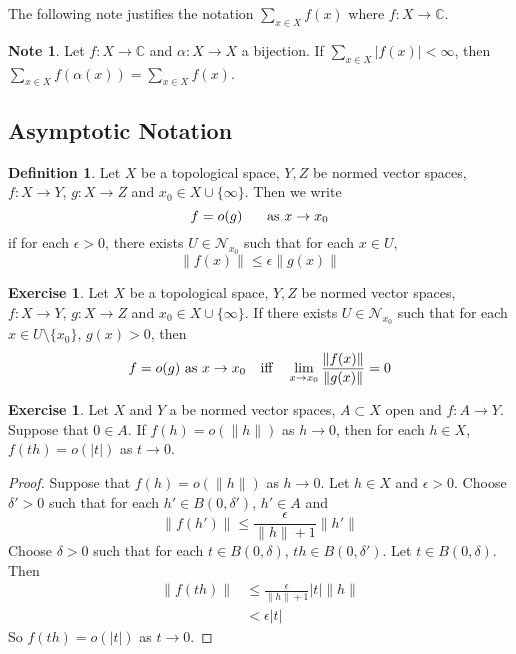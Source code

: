 \documentclass[12pt]{amsart}
\theoremstyle{definition}
\newtheorem{defn}[definition]{Definition}
\newtheorem{note}[definition]{Note}
\newtheorem{ex}[definition]{Exercise}
\newcommand{\al}{\alpha}
\newcommand{\del}{\delta}
\newcommand{\ep}{\epsilon}
\newcommand{\C}{\mathbb{C}}
\newcommand{\MN}{\mathcal{N}}
\newcommand{\lex}[1]{\label{ex:#1}}
\newcommand{\ld}[1]{\label{defn:#1}}
\begin{document}
	The following note justifies the notation $\sum_{x \in X}f(x)$ where $f:X \rightarrow \C$.
	
	\begin{note}
		Let $f:X \rightarrow \C$ and $\al:X \rightarrow X$ a bijection. If $\sum_{x \in X}|f(x)|< \infty$, then $\sum_{x \in X}f( \al (x)) = \sum_{x \in X}f(x) $.
	\end{note}
	
	\newpage	
	
	\subsection{Asymptotic Notation}
	
	\begin{defn} \ld{}
	Let $X$ be a topological space, $Y, Z$ be normed vector spaces, $f:X \rightarrow Y$, $g: X \rightarrow Z$ and $x_0 \in X \cup \{\infty\}$. Then we write $$f = o(g) \hspace{.5cm} \text{ as } x \rightarrow x_0$$ if for each $\ep >0$, there exists $U \in \MN_{x_0}$ such that for each $x \in U$, $$\|f(x)\| \leq \ep\|g(x)\|$$
	\end{defn}
	
	\begin{ex} \lex{}
	Let $X$ be a topological space, $Y, Z$ be normed vector spaces, $f:X \rightarrow Y$, $g: X \rightarrow Z$ and $x_0 \in X \cup \{\infty\}$. If there exists $U \in \MN_{x_0}$ such that for each $x \in U \setminus \{x_0\}$, $g(x) > 0$, then $$f = o(g) \text{ as } x \rightarrow x_0 \hspace{.25cm} \text{ iff } \hspace{.25cm}  \lim_{x \rightarrow x_0} \frac{\| f(x) \|}{\| g(x) \|} = 0$$
	\end{ex}	
	
	\begin{ex} \lex{}
	Let $X$ and $Y$ a be normed vector spaces, $A \subset X$ open and $f:A \rightarrow Y$. Suppose that $0 \in A$. If $f(h) = o(\|h\|)$ as $h \rightarrow 0$, then for each $h \in X$,  $f(th) = o(|t|)$ as $t \rightarrow 0$.
	\end{ex}	
	
	\begin{proof}
	Suppose that $f(h) = o(\|h\|)$ as $h \rightarrow 0$.  Let $h \in X$ and $\ep >0$. Choose $\del' >0 $ such that for each $h' \in B(0, \del')$, $h' \in A$ and 
	$$\|f(h')\| \leq \frac{\ep}{\|h\|+1} \|h'\|$$ 
	Choose $\del >0$ such that for each $t \in B(0,\del)$, $th \in B(0,\del')$. Let $t \in B(0,\del)$. Then 
	\begin{align*}
	\|f(th)\| 
	&\leq \frac{\ep}{\|h\|+1} |t|\|h\| \\
	&< \ep |t|
	\end{align*}
	So $f(th) = o(|t|)$ as $t \rightarrow 0$.
	\end{proof}		
	
\end{document}
